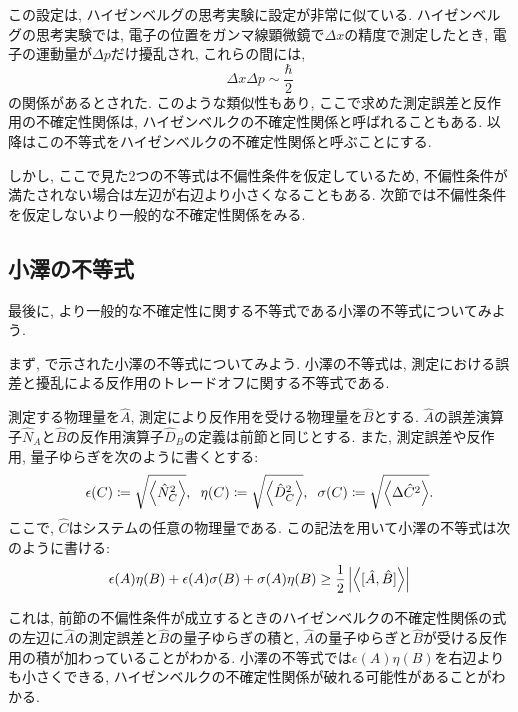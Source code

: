 この設定は, ハイゼンベルグの思考実験に設定が非常に似ている. ハイゼンベルグの思考実験では, 電子の位置をガンマ線顕微鏡で\(\Delta x\)の精度で測定したとき, 電子の運動量が\(\Delta p\)だけ擾乱され, これらの間には,
\begin{equation}
  \Delta x\Delta p\sim\frac{\hbar}{2}
\end{equation}
の関係があるとされた. このような類似性もあり, ここで求めた測定誤差と反作用の不確定性関係は, ハイゼンベルクの不確定性関係と呼ばれることもある. 以降はこの不等式をハイゼンベルクの不確定性関係と呼ぶことにする. 

しかし, ここで見た2つの不等式は不偏性条件を仮定しているため, 不偏性条件が満たされない場合は左辺が右辺より小さくなることもある. 次節では不偏性条件を仮定しないより一般的な不確定性関係をみる. 

\subsection{小澤の不等式}
最後に, より一般的な不確定性に関する不等式である小澤の不等式についてみよう. 

まず, \cite{M.Ozawa}で示された小澤の不等式についてみよう. 小澤の不等式は, 測定における誤差と擾乱による反作用のトレードオフに関する不等式である. 

測定する物理量を\(\hat{A}\), 測定により反作用を受ける物理量を\(\hat{B}\)とする. \(\hat{A}\)の誤差演算子\(\hat{N}_A\)と\(\hat{B}\)の反作用演算子\(\hat{D}_B\)の定義は前節と同じとする. また, 測定誤差や反作用, 量子ゆらぎを次のように書くとする:
\begin{equation}
  \epsilon(C)\coloneqq\sqrt{\ev{\hat{N}_C^2}},\hspace{2mm}\eta(C)\coloneqq\sqrt{\ev{\hat{D}^2_C}},\hspace{2mm}\sigma(C)\coloneqq\sqrt{\ev{\Delta\hat{C}^2}}.
\end{equation}
ここで, \(\hat{C}\)はシステムの任意の物理量である. この記法を用いて小澤の不等式は次のように書ける:
\begin{equation}
  \epsilon(A)\eta(B)+\epsilon(A)\sigma(B)+\sigma(A)\eta(B)\geq\frac{1}{2}\left|\ev{[\hat{A},\hat{B}]}\right|
\end{equation}

これは, 前節の不偏性条件が成立するときのハイゼンベルクの不確定性関係の式の左辺に\(\hat{A}\)の測定誤差と\(\hat{B}\)の量子ゆらぎの積と, \(\hat{A}\)の量子ゆらぎと\(\hat{B}\)が受ける反作用の積が加わっていることがわかる. 小澤の不等式では\(\epsilon(A)\eta(B)\)を右辺よりも小さくできる, ハイゼンベルクの不確定性関係が破れる可能性があることがわかる. 

